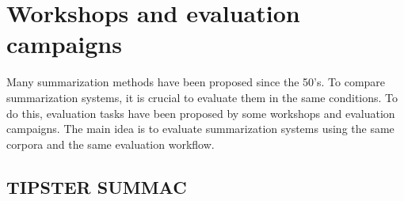 \section{Workshops and evaluation campaigns}

Many summarization methods have been proposed since the 50's. 
To compare summarization systems, it is crucial to evaluate them in the same conditions. 
To do this, evaluation tasks have been proposed by some workshops and evaluation campaigns.
The main idea is to evaluate summarization systems using the same corpora and the same evaluation workflow. 

\subsection{TIPSTER SUMMAC}

